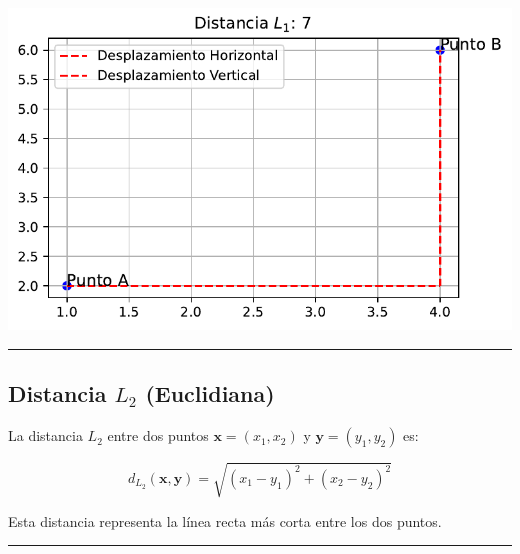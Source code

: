 \documentclass[
  letterpaper,
  DIV=11,
  numbers=noendperiod]{scrartcl}
\begin{document}
\includegraphics{presentacion_files/figure-pdf/cell-6-output-1.pdf}

\begin{center}\rule{0.5\linewidth}{0.5pt}\end{center}

\subsection{\texorpdfstring{Distancia \(L_2\)
(Euclidiana)}{Distancia L\_2 (Euclidiana)}}\label{distancia-l_2-euclidiana}

La distancia \(L_2\) entre dos puntos \(\mathbf{x} = (x_1, x_2)\) y
\(\mathbf{y} = (y_1, y_2)\) es:

\[
d_{L_2}(\mathbf{x}, \mathbf{y}) = \sqrt{(x_1 - y_1)^2 + (x_2 - y_2)^2}
\]

Esta distancia representa la línea recta más corta entre los dos puntos.

\begin{center}\rule{0.5\linewidth}{0.5pt}\end{center}
\end{document}
